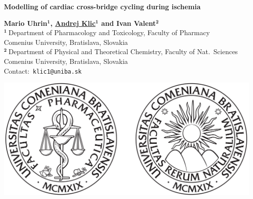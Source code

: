 \documentclass[a0,portrait]{a0poster}
\begin{document}

\begin{center}
{\veryHuge \color{NavyBlue} \textbf{Modelling of cardiac cross-bridge
cycling during ischemia}\\ [2cm]}%
\end{center}
\begin{minipage}[b]{0.63\linewidth}
\huge \textbf{Mario Uhrin$\mathbf{^1}$, \underline{Andrej
    Klic$\mathbf{^1}$} and Ivan Valent$\mathbf{^2}$}\\[0.4cm] %
\Large $\mathbf{^1~}$Department of Pharmacology and Toxicology, Faculty of Pharmacy\\
Comenius University, Bratislava, Slovakia \\[0.2cm]
\Large $\mathbf{^2~}$Department of Physical and Theoretical Chemistry, Faculty of Nat.~Sciences\\
Comenius University, Bratislava, Slovakia\\[0.2cm]
\Large Contact:~\texttt{klic1@uniba.sk}\\
\end{minipage}
%
\begin{minipage}[b]{0.45\linewidth}
\includegraphics[scale=0.30]{faf-prif_logos}\\
\end{minipage}
\end{document}
